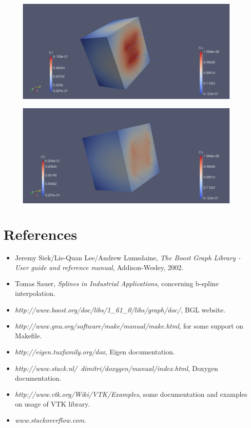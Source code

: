 \documentclass[10pt]{article} %
\begin{document}
	\begin{figure}[!h]
		\centering
		\includegraphics[width=0.92\linewidth]{ct2}
		\label{fig:ct2}
	\end{figure}
	
	\begin{figure}[!h]
		\centering
		\includegraphics[width=0.92\linewidth]{ct3}
		\label{fig:ct3}
	\end{figure}
	\newpage
	
	\section{References}
	\begin{itemize}
		\item Jeremy Siek/Lie-Quan Lee/Andrew Lumsdaine, \textit{The Boost Graph Library - User guide and reference manual}, Addison-Wesley, 2002.
		\item Tomas Sauer, \textit{Splines in Industrial Applications}, concerning b-spline interpolation.
		\item \textit{http://www.boost.org/doc/libs/1\_61\_0/libs/graph/doc/}, BGL website.
		\item \textit{http://www.gnu.org/software/make/manual/make.html}, for some support on Makefile.
		\item \textit{http://eigen.tuxfamily.org/dox}, Eigen documentation.
		\item \textit{http://www.stack.nl/~dimitri/doxygen/manual/index.html}, Doxygen documentation.
		\item \textit{http://www.vtk.org/Wiki/VTK/Examples}, some documentation and examples on usage of VTK library.
		\item \textit{www.stackoverflow.com}.
	\end{itemize}
\end{document}
